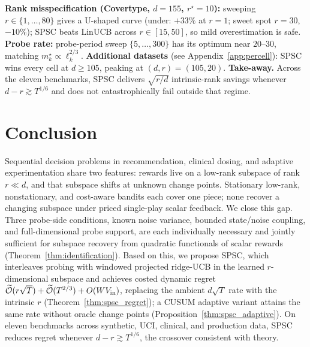 \documentclass{article}
\newcommand{\tilO}{\widetilde{\mathcal{O}}}
\begin{document}
\textbf{Rank misspecification (Covertype, $d{=}155$, $r^\star{=}10$):}
sweeping $r\in\{1,\dots,80\}$ gives a U-shaped curve (under: $+33\%$
at $r{=}1$; sweet spot $r{=}30$, $-10\%$); SPSC beats LinUCB across
$r\in[15,50]$, so mild overestimation is safe.
\textbf{Probe rate:} probe-period sweep $\{5,\dots,300\}$ has its
optimum near $20$--$30$, matching $m_k^\star\propto \ell_k^{2/3}$.
\textbf{Additional datasets} (see
Appendix~\ref{app:percell}): SPSC wins every cell at $d\ge 105$,
peaking at $(d,r){=}(105,20)$.
\textbf{Take-away.} Across the eleven benchmarks, SPSC delivers
$\sqrt{r/d}$ intrinsic-rank savings whenever $d-r\gtrsim T^{1/6}$
and does not catastrophically fail outside that regime.

\section{Conclusion}
\label{sec:conclusion}

 Sequential decision problems in recommendation, clinical dosing,
  and adaptive experimentation share two features: rewards live on a
  low-rank subspace of rank $r\ll d$, and that subspace shifts at
  unknown change points. Stationary low-rank, nonstationary, and
  cost-aware bandits each cover one piece; none recover a changing
  subspace under priced single-play scalar feedback. We close this gap. Three probe-side conditions, known noise
  variance, bounded state/noise coupling, and full-dimensional probe
  support, are each individually necessary and jointly sufficient for
  subspace recovery from quadratic functionals of scalar rewards
  (Theorem~\ref{thm:identification}). Based on this, we propose SPSC,
  which interleaves probing with windowed projected ridge-UCB in the
  learned $r$-dimensional subspace and achieves costed dynamic regret
  $\tilO(r\sqrt T)+\tilO(T^{2/3})+O(WV_{\rm in})$, replacing the
  ambient $d\sqrt T$ rate with the intrinsic $r$
  (Theorem~\ref{thm:spsc_regret}); a CUSUM adaptive variant attains
  the same rate without oracle change points
  (Proposition~\ref{thm:spsc_adaptive}). On eleven benchmarks across
  synthetic, UCI, clinical, and production data, SPSC reduces regret
  whenever $d-r\gtrsim T^{1/6}$, the crossover consistent with theory.





\clearpage
\appendix
\end{document}
